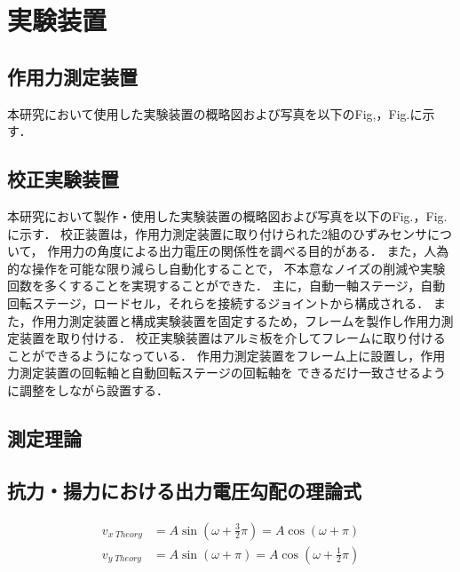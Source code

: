 \section{実験装置}

\subsection{作用力測定装置}
本研究において使用した実験装置の概略図および写真を以下のFig,，Fig.に示す．

\subsection{校正実験装置}
本研究において製作・使用した実験装置の概略図および写真を以下のFig.，Fig.に示す．
校正装置は，作用力測定装置に取り付けられた2組のひずみセンサについて，
作用力の角度による出力電圧の関係性を調べる目的がある．
また，人為的な操作を可能な限り減らし自動化することで，
不本意なノイズの削減や実験回数を多くすることを実現することができた．
主に，自動一軸ステージ，自動回転ステージ，ロードセル，それらを接続するジョイントから構成される．
また，作用力測定装置と構成実験装置を固定するため，フレームを製作し作用力測定装置を取り付ける．
校正実験装置はアルミ板を介してフレームに取り付けることができるようになっている．
作用力測定装置をフレーム上に設置し，作用力測定装置の回転軸と自動回転ステージの回転軸を
できるだけ一致させるように調整をしながら設置する．


\subsection{測定理論}

\subsection{抗力・揚力における出力電圧勾配の理論式}

\begin{align}
    v_{x\; Theory} &= A \sin \left(\omega + \frac{3}{2} \pi\right) = A \cos \left(\omega + \pi\right) \\ 
    v_{y\; Theory} &= A \sin \left(\omega + \pi\right) = A \cos \left(\omega + \frac{1}{2} \pi\right) 
\end{align}
